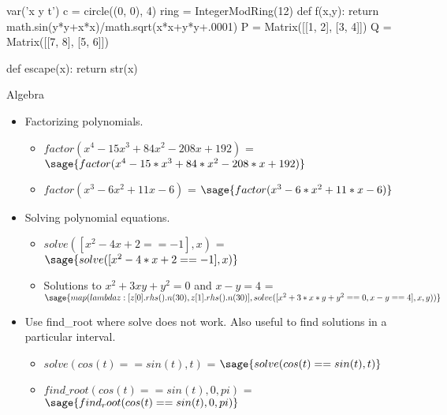 \documentclass{beamer}
\begin{document}
\begin{sagesilent}
 var('x y t')
 c = circle((0, 0), 4)
 ring = IntegerModRing(12)
 def f(x,y):
  return math.sin(y*y+x*x)/math.sqrt(x*x+y*y+.0001)
 P = Matrix([[1, 2], [3, 4]])
 Q = Matrix([[7, 8], [5, 6]])
 
 def escape(x):
  return str(x)

\end{sagesilent}

\begin{frame}{Algebra}
  \begin{itemize}
    \item Factorizing polynomials.
    \begin{itemize}
      \item $factor(x^{4} - 15 x^{3} + 84 x^{2} - 208 x + 192)$ = $\sage{factor(x^4 - 15*x^3 + 84*x^2 - 208*x + 192)}$
      \item $factor(x^{3} - 6 x^{2} +11 x -6)$ = $\sage{factor(x^3 - 6*x^2 +11*x -6)}$
    \end{itemize}
    \item Solving polynomial equations.
    \begin{itemize}
     \item $solve([x^{2} - 4 x + 2 == -1], x)$ = $\sage{solve([x^2 - 4*x + 2 == -1], x)}$
     \item Solutions to $x^{2}+ 3 x y + y^{2} = 0$ and $x - y = 4$ = $\sage{map(lambda z: [z[0].rhs().n(30), z[1].rhs().n(30)], solve([x^2+3*x*y+y^2 == 0, x - y == 4], x, y))}$
    \end{itemize}
    \item Use find\_root where solve does not work. Also useful to find solutions in a particular interval.
    \begin{itemize}
     \item $solve(cos(t) == sin(t), t)$ = $\sage{solve(cos(t) == sin(t), t)}$
     \item $find \_ root(cos(t) == sin(t), 0, pi)$ = $\sage{find_root(cos(t) == sin(t), 0, pi)}$
    \end{itemize}
  \end{itemize}
\end{frame}
\end{document}
